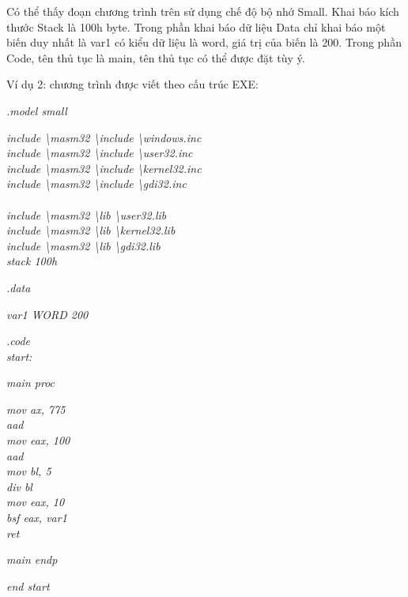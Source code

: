 	Có thể thấy đoạn chương trình trên sử dụng chế độ bộ nhớ Small. Khai báo kích thước Stack là 100h byte. Trong phần khai báo dữ liệu Data chỉ khai báo một biến duy nhất là var1 có kiểu dữ liệu là word, giá trị của biến là 200. Trong phần Code, tên thủ tục là main, tên thủ tục có thể được đặt tùy ý.

\newpage
Ví dụ 2:  chương trình được viết theo cấu trúc EXE:

\begin{boxedminipage}{15cm}
	\begin{normalsize}						
				\textit {.model small}
				\begin{changemargin}{1cm}{0.5cm} 
     			\textit { include \textbackslash masm32 \textbackslash include \textbackslash windows.inc}  \\  
				\textit { include \textbackslash masm32 \textbackslash include \textbackslash user32.inc } \\
				\textit { include \textbackslash masm32 \textbackslash include \textbackslash kernel32.inc } \\
				\textit { include \textbackslash masm32 \textbackslash include \textbackslash gdi32.inc} \\ \\
				\textit { include \textbackslash masm32 \textbackslash lib \textbackslash user32.lib} \\ 
				\textit { include \textbackslash masm32 \textbackslash lib \textbackslash kernel32.lib } \\
				\textit { include \textbackslash masm32 \textbackslash lib \textbackslash gdi32.lib} \\				
				\textit {stack 100h}
				\end{changemargin}				
				\textit {.data}
				\begin{changemargin}{1cm}{0.5cm} 
						\textit {var1 WORD  200}
				\end{changemargin}				
				\textit {.code}\\
				\textit {start: }
					\begin{changemargin}{1cm}{0.5cm} 
    							\textit {main proc}
    								\begin{changemargin}{1.5cm}{0.5cm} 
        								\textit {mov ax, 775}\\
       							 		\textit {aad   }\\
        								\textit {	mov eax, 100 }\\
       									\textit { aad}\\
        								\textit {	mov bl, 5}\\
        								\textit {	div bl   }\\
										\textit {mov eax, 10}\\
   										\textit {bsf eax, var1}		\\
		  								\textit {ret}
		  							\end{changemargin}	
     						\textit {main endp}
     				\end{changemargin}				
				\textit {end start}
	\end{normalsize}
	\end{boxedminipage}
	
